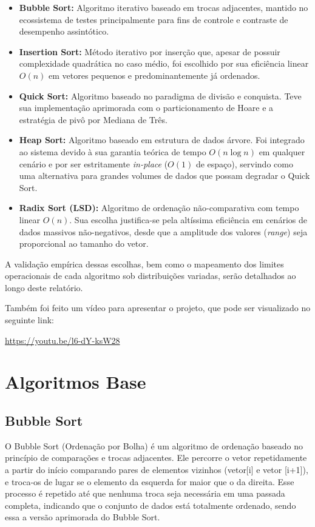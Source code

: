 \documentclass{article}
\begin{document}
    \begin{itemize}
        \item \textbf{Bubble Sort:} Algoritmo iterativo baseado em trocas adjacentes, mantido no ecossistema de testes principalmente para fins de controle e contraste de desempenho assintótico.
        \item \textbf{Insertion Sort:} Método iterativo por inserção que, apesar de possuir complexidade quadrática no caso médio, foi escolhido por sua eficiência linear $O(n)$ em vetores pequenos e predominantemente já ordenados.
        \item \textbf{Quick Sort:} Algoritmo baseado no paradigma de divisão e conquista. 
        Teve sua implementação aprimorada com o particionamento de Hoare e a estratégia de pivô por Mediana de Três.
        \item \textbf{Heap Sort:} Algoritmo baseado em estrutura de dados árvore. 
        Foi integrado ao sistema devido à sua garantia teórica de tempo $O(n \log n)$ em qualquer cenário e por ser estritamente \textit{in-place} ($O(1)$ de espaço), servindo como uma alternativa para grandes volumes de dados que possam degradar o Quick Sort.
        \item \textbf{Radix Sort (LSD):} Algoritmo de ordenação não-comparativa com tempo linear $O(n)$. 
        Sua escolha justifica-se pela altíssima eficiência em cenários de dados massivos não-negativos, desde que a amplitude dos valores (\textit{range}) seja proporcional ao tamanho do vetor.
    \end{itemize}

    A validação empírica dessas escolhas, bem como o mapeamento dos limites operacionais de cada algoritmo sob distribuições variadas, serão detalhados ao longo deste relatório.

    Também foi feito um vídeo para apresentar o projeto, que pode ser visualizado no seguinte link:
    \begin{center}
    \url{https://youtu.be/l6-dY-ksW28}
    \end{center}

\section{Algoritmos Base}

    \subsection{Bubble Sort}
        O Bubble Sort (Ordenação por Bolha) é um algoritmo de ordenação baseado no princípio de comparações e trocas adjacentes. 
        Ele percorre o vetor repetidamente a partir do início comparando pares de elementos vizinhos (vetor[i] e vetor [i+1]), e troca-os de lugar se o elemento da esquerda for maior que o da direita.
        Esse processo é repetido até que nenhuma troca seja necessária em uma passada completa, indicando que o conjunto de dados está totalmente ordenado, sendo essa a versão aprimorada do Bubble Sort.
\end{document}

